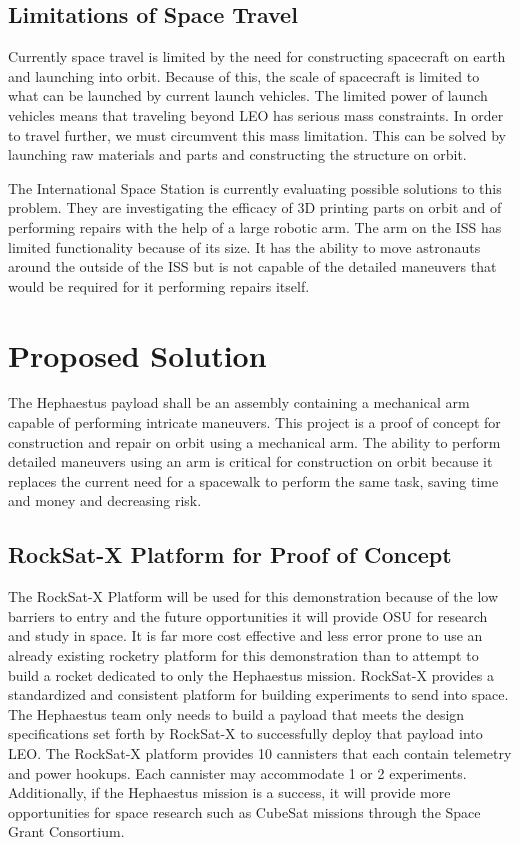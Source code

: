 \documentclass[letterpaper,10pt]{article}
\begin{document}
\subsection{Limitations of Space Travel}
Currently space travel is limited by the need for constructing spacecraft on earth and launching into
orbit. Because of this, the scale of spacecraft is limited to what can be launched by current launch
 vehicles. The limited power of launch vehicles means that traveling beyond LEO has serious mass 
constraints. In order to travel further, we must circumvent this mass limitation. This can be 
solved by launching raw materials and parts and constructing the structure on orbit. 

The International Space Station is currently evaluating possible solutions to this problem. They are 
investigating the efficacy of 3D printing parts on orbit and of performing repairs with the help of 
a large robotic arm. The arm on the ISS has limited functionality because of its size.
 It has the ability to move astronauts around the outside of the ISS but is not capable of the detailed
maneuvers that would be required for it performing repairs itself.


\section{Proposed Solution}
The Hephaestus payload shall be an assembly containing a mechanical arm capable of performing
intricate maneuvers.
This project is a proof of concept for construction and repair on orbit using a mechanical arm. 
The ability to perform detailed maneuvers using an arm is critical for construction on orbit because
it replaces the current need for a spacewalk to perform the same task, saving time and money and
decreasing risk.

\subsection{RockSat-X Platform for Proof of Concept}
The RockSat-X Platform will be used for this demonstration because of the low barriers to entry and
the future opportunities it will provide OSU for research and study in space.
It is far more cost effective and less error prone to use an already existing rocketry platform for
this demonstration than to attempt to build a rocket dedicated to only the Hephaestus mission.
RockSat-X provides a standardized and consistent platform for building experiments to send into space.
The Hephaestus team only needs to build a payload that meets the design specifications set forth by
RockSat-X to successfully deploy that payload into LEO.
The RockSat-X platform provides 10 cannisters that each contain telemetry and power hookups.
Each cannister may accommodate 1 or 2 experiments.
Additionally, if the Hephaestus mission is a success, it will provide more opportunities for space
research such as CubeSat missions through the Space Grant Consortium.
\end{document}
